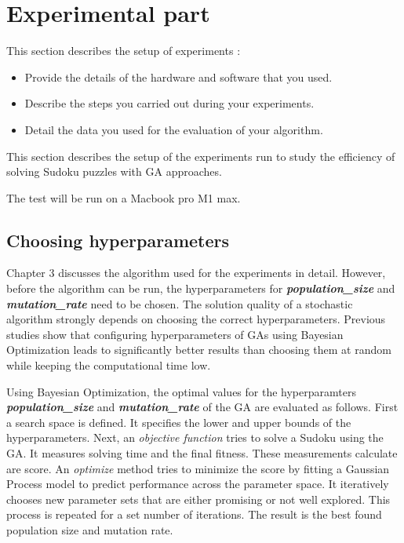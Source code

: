 \section{Experimental part}
\label{sec:experimentation}

{\color{red}
This section describes the setup of experiments \cite{zobel2014experimentation}:

\begin{itemize}
    \item Provide the details of the hardware and software that you used.
    \item Describe the steps you carried out during your experiments.
    \item Detail the data you used for the evaluation of your algorithm.
\end{itemize}
}

This section describes the setup of the experiments run to study the efficiency of solving Sudoku puzzles with GA approaches.

The test will be run on a Macbook pro M1 max.

\subsection{Choosing hyperparameters}
Chapter 3 discusses the algorithm used for the experiments in detail. However, before the algorithm can be run, the hyperparameters for \textit{\textbf{population\_size}} and \textit{\textbf{mutation\_rate}} need to be chosen. The solution quality of a stochastic algorithm strongly depends on choosing the correct hyperparameters. Previous studies show that configuring hyperparameters of GAs using Bayesian Optimization leads to significantly better results than choosing them at random while keeping the computational time low\cite{Ruether}.

Using Bayesian Optimization, the optimal values for the hyperparamters \textit{\textbf{population\_size}} and \textit{\textbf{mutation\_rate}} of the GA are evaluated as follows. First a search space is defined. It specifies the lower and upper bounds of the hyperparameters. Next, an \textit{objective function} tries to solve a Sudoku using the GA. It measures solving time and the final fitness. These measurements calculate are score. An \textit{optimize} method tries to minimize the score by fitting a Gaussian Process model to predict performance across the parameter space. It iteratively chooses new parameter sets that are either promising or not well explored. This process is repeated for a set number of iterations. The result is the best found population size and mutation rate. 

